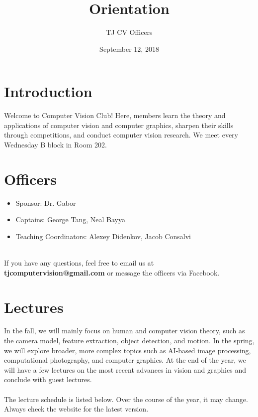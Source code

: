 \documentclass{article}
\title{Orientation}
\author{TJ CV Officers }
\date{September 12, 2018}
\begin{document}
\maketitle

\section{Introduction}
Welcome to Computer Vision Club! Here, members learn the theory and applications of computer vision and computer graphics, sharpen their skills through competitions, and conduct computer vision research. We meet every Wednesday B block in Room 202. 

\section{Officers}
\begin{itemize}
    \item Sponsor: Dr. Gabor
    \item Captains: George Tang, Neal Bayya
    \item Teaching Coordinators: Alexey Didenkov, Jacob Consalvi 
\end{itemize}
\\
If you have any questions, feel free to email us at \textbf{tjcomputervision@gmail.com} or message the officers via Facebook.   

\section{Lectures}
In the fall, we will mainly focus on human and computer vision theory, such as the camera model, feature extraction, object detection, and motion. In the spring, we will explore broader, more complex topics such as AI-based image processing, computational photography, and computer graphics. At the end of the year, we will have a few lectures on the most recent advances in vision and graphics and conclude with guest lectures. \\ \\
The lecture schedule is listed below. Over the course of the year, it may change. Always check the website for the latest version. 
\end{document}
